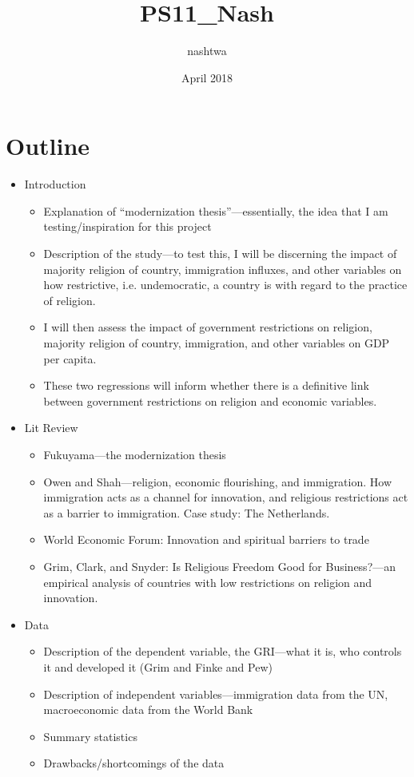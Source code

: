\documentclass{article}
\title{PS11_Nash}
\author{nashtwa }
\date{April 2018}
\begin{document}
\section{Outline}
\begin{itemize}
\item Introduction
    \begin{itemize}
    \item Explanation of “modernization thesis”—essentially, the idea that I am testing/inspiration for this project
\item Description of the study—to test this, I will be discerning the impact of majority religion of country, immigration influxes, and other variables on how restrictive, i.e. undemocratic, a country is with regard to the practice of religion.
\item I will then assess the impact of government restrictions on religion, majority religion of country, immigration, and other variables on GDP per capita.
\item These two regressions will inform whether there is a definitive link between government restrictions on religion and economic variables.
    \end{itemize}
\item Lit Review
    \begin{itemize}
    \item Fukuyama—the modernization thesis
\item Owen and Shah—religion, economic flourishing, and immigration. How immigration acts as a channel for innovation, and religious restrictions act as a barrier to immigration. Case study: The Netherlands.
\item World Economic Forum: Innovation and spiritual barriers to trade
\item Grim, Clark, and Snyder: Is Religious Freedom Good for Business?—an empirical analysis of countries with low restrictions on religion and innovation.

    \end{itemize}
\item Data
    \begin{itemize}
    \item Description of the dependent variable, the GRI—what it is, who controls it and developed it (Grim and Finke and Pew)
\item Description of independent variables—immigration data from the UN, macroeconomic data from the World Bank
\item Summary statistics
\item Drawbacks/shortcomings of the data


\end{itemize}
\end{itemize}
\end{document}
